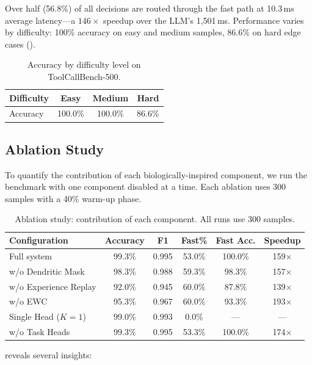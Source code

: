 \documentclass[11pt,a4paper]{article}
\begin{document}
Over half (56.8\%) of all decisions are routed through the fast path at 10.3\,ms average latency---a $146\times$ speedup over the LLM's 1,501\,ms.
Performance varies by difficulty: 100\% accuracy on easy and medium samples, 86.6\% on hard edge cases ().

\begin{table}[t]
\centering
\caption{Accuracy by difficulty level on ToolCallBench-500.}
\label{tab:by_difficulty}
\begin{tabular}{lccc}
\toprule
Difficulty & Easy & Medium & Hard \\
\midrule
Accuracy & 100.0\% & 100.0\% & 86.6\% \\
\bottomrule
\end{tabular}
\end{table}

\subsection{Ablation Study}\label{sec:ablation}

To quantify the contribution of each biologically-inspired component, we run the benchmark with one component disabled at a time.
Each ablation uses 300 samples with a 40\% warm-up phase.

\begin{table}[t]
\centering
\caption{Ablation study: contribution of each component. All runs use 300 samples.}
\label{tab:ablation}
\begin{tabular}{lccccc}
\toprule
Configuration & Accuracy & F1 & Fast\% & Fast Acc. & Speedup \\
\midrule
Full system & 99.3\% & 0.995 & 53.0\% & 100.0\% & 159$\times$ \\
w/o Dendritic Mask & 98.3\% & 0.988 & 59.3\% & 98.3\% & 157$\times$ \\
w/o Experience Replay & 92.0\% & 0.945 & 60.0\% & 87.8\% & 139$\times$ \\
w/o EWC & 95.3\% & 0.967 & 60.0\% & 93.3\% & 193$\times$ \\
Single Head ($K=1$) & 99.0\% & 0.993 & 0.0\% & --- & --- \\
w/o Task Heads & 99.3\% & 0.995 & 53.3\% & 100.0\% & 174$\times$ \\
\bottomrule
\end{tabular}
\end{table}

 reveals several insights:
\end{document}

